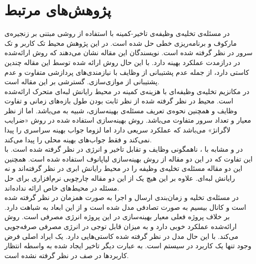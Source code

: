 \section{پژوهش‌های مرتبط}
در \cite{Liu} مسئله‌ی تخلیه‌ی وظیفه‌ی تاخیر-کمینه با استفاده از روشی مبتنی بر زنجیره‌ی مارکوف و برنامه‌ریزی خطی حل شده است. در این پژوهش محیط تک کاربر و تک سرور در نظر گرفته شده است. نویسندگان این مقاله نشان می‌دهند که روش ارائه‌شده در درازمدت عملکرد بهینه دارد. با این حال روش ارائه شده توسط این مقاله چندین کاستی دارد، از جمله عدم پشتیبانی از وظایف با نیازمندی‌های پردازشی متفاوت و عدم پشتیبانی از موازی‌سازی. \CurrentProject گسترشی بر این مقاله است. \\

در \cite{samanta} مکانزیم تخلیه‌ی وظیفه‌ای با هزینه‌ی کمینه در محیط رایانش لبه‌ای متحرک ارائه‌شده است. محیط در نظر گرفته شده از نظر ثابت بودن طول بازه‌های زمانی و تفاوت وظایف و همچنین نحوه‌ی تعریف مسئله‌ی بهینه‌سازی، شبیه به \CurrentProject می‌باشد. اما از نظر معیار و تعداد سرور متفاوت می‌باشد. روش بهینه‌سازی استفاده شده در \CurrentProject روش «ضرایب لاگرانژ» می‌باشد که عملکرد سریعی دارد اما لزوما جواب بهینه سراسری را پیدا نمی‌کند و فقط جواب‌های بهینه محلی را پیدا می‌کند. \\

در \cite{kwak} و \cite{jiang} مشابه با \CurrentProject، ناهمگونی وظایف و تقابل تاخیر و انرژی در نظر گرفته شده است. با این تفاوت که در این دو مقاله از روش بهینه‌سازی لیاپانوف استفاده شده است. همچنین این دو مقاله مسئله‌ی تخلیه‌ی وظیفه را در محیط رایانش ابری در نظر گرفته‌اند و نه رایانش لبه‌ای. علاوه بر این هیچ یک از این دو مقاله چارچوبی نرم‌افزاری برای حل مسئله در محیط‌های خاص ارائه نداده‌اند. \\

در \cite{zhang2013} مسئله‌ی تخلیه و زمان‌بندی ارسال و اجرا به صورت همزمان در نظر گرفته شده است و کانال بیسیم به صورت تصادفی مدل شده است و از این ابعاد به \CurrentProject شباهت دارد. بر خلاف پروژه فعلی معیار بهینه‌سازی در این پروژه انرژی مصرفی است. روش ارائه‌شده عملکرد خوبی دارد و به میزان قابل توجی در انرژی مصرفی صرفه‌جویی می‌کند. با این حال مدل در نظر گرفته شده کاستی‌هایی دارد. یک ایراد اصلی فرض وجود تنها یک کاربرد در سیستم است. به عبارت دیگر تاخیر ایجاد شده به واسطه انتظار کاربردها در صف در نظر گرفته نشده است.

\clearpage
